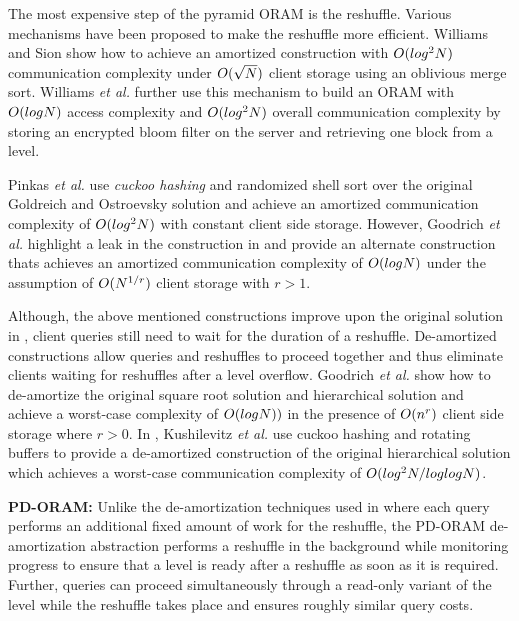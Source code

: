 The most expensive step of the pyramid ORAM is the reshuffle. Various mechanisms have been proposed to make the reshuffle 
more efficient. Williams and Sion \cite{usablepir} show how to achieve an amortized construction with $O(log^{2}N)$ communication 
complexity under $O(\sqrt{N})$ client storage using an oblivious merge sort. Williams {\em et al.} further use this mechanism to 
build an ORAM with $O(logN)$ access complexity and $O(log^{2}N)$ overall communication complexity by storing an encrypted bloom 
filter on the server and retrieving one block from a level. 

Pinkas {\em et al.} \cite{Pinkasoram} use {\em cuckoo hashing} and randomized shell sort \cite{randomizedshellsort} 
over the original Goldreich and Ostroevsky solution \cite{goldreich} and achieve an amortized communication 
complexity of $O(log^{2}N)$ with constant client side storage. However, Goodrich {\em et al.} \cite{goodrichoram} 
highlight a leak in the construction in \cite{Pinkasoram} and provide an alternate construction thats achieves an amortized 
communication complexity of $O(logN)$ under the assumption of $O(N^{1/r})$ client storage with $r > 1$. 

Although, the above mentioned constructions improve upon the original solution in \cite{goldreich}, client queries still 
need to wait for the duration of a reshuffle. De-amortized constructions allow queries and reshuffles to proceed together and 
thus eliminate clients waiting for reshuffles after a level overflow. Goodrich {\em et al.} \cite{goodrich_deamortized} 
show how to de-amortize the original square root solution and hierarchical solution \cite{goldreich} and achieve a worst-case 
complexity of $O(logN))$ in the presence of $O(n^{r})$ client side storage where $r > 0$. In \cite{kushilevitzoram}, 
Kushilevitz {\em et al.} use cuckoo hashing and rotating buffers to provide a de-amortized construction of the original hierarchical 
solution \cite{goldreich} which achieves a worst-case communication complexity of $O(log^{2}N/loglogN)$. 

{\bf PD-ORAM:} Unlike the de-amortization techniques used in \cite{kushilevitzoram,goodrich_deamortized} where each query performs an 
additional fixed amount of work for the reshuffle, the PD-ORAM \cite{privatefs} de-amortization abstraction performs a reshuffle 
in the background while monitoring progress to ensure that a level is ready after a reshuffle as soon as it is required. 
Further, queries can proceed simultaneously through a read-only variant of the level while the reshuffle takes place and ensures 
roughly similar query costs.

